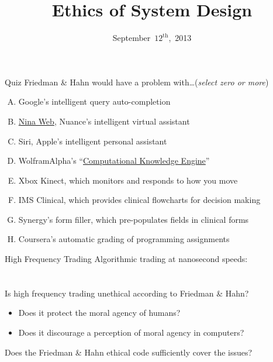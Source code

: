 \documentclass{beamer}
\title{Ethics of System Design}
\date{September~$12^{\text{th}}$,~2013}
\begin{document}
\begin{frame}
\titlepage
\end{frame}

\begin{frame}{Quiz}
Friedman \& Hahn would have a problem with\ldots \hfill (\emph{select zero or more})
\begin{enumerate}[(A)]
\item<1> Google's intelligent query auto-completion
\item<1-2> \href{http://www.nuance.com/landing-pages/products/nina/default.asp}{Nina Web}, Nuance's intelligent virtual assistant
\item<1-2> Siri, Apple's intelligent personal assistant
\item<1-2> WolframAlpha's ``\href{http://www.wolframalpha.com/}{Computational Knowledge Engine}''
\item<1> Xbox Kinect, which monitors and responds to how you move
\item<1-2> IMS Clinical, which provides clinical flowcharts for decision making
\item<1> Synergy's form filler, which pre-populates fields in clinical forms
\item<1> Coursera's automatic grading of programming assignments
\end{enumerate}
\end{frame}

\begin{frame}{High Frequency Trading}
Algorithmic trading at nanosecond speeds: \\
\href{http://www.colbertnation.com/the-colbert-report-videos/421265/november-14-2012/high-frequency-trading}{} \\
\href{http://www.colbertnation.com/the-colbert-report-videos/421266/november-14-2012/high-frequency-trading---christopher-steiner}{} \\
\bigskip
Is high frequency trading unethical according to Friedman \& Hahn?
\begin{itemize}
\item Does it protect the moral agency of humans?
\item Does it discourage a perception of moral agency in computers?
\end{itemize}
\bigskip
Does the Friedman \& Hahn ethical code sufficiently cover the issues?
\end{frame}
\end{document}
